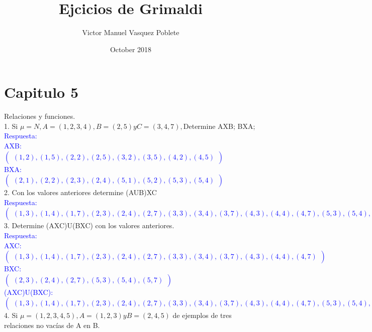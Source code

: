 \documentclass{article}
\title{Ejcicios de Grimaldi}
\author{Victor Manuel Vasquez Poblete }
\date{October 2018}
\begin{document}
\maketitle
\section{Capitulo 5}Relaciones y funciones.\\
1.  Si $\mu =N, A=(1,2,3,4), B=(2,5) y C=(3,4,7),$Determine AXB; BXA;\\
\textcolor{blue}{Respuesta:\\AXB:\\
$
\left(\begin{smallmatrix}
(1,2),(1,5),(2,2),(2,5),(3,2),(3,5),(4,2),(4,5)
\end{smallmatrix}\right)
$\\
BXA:\\
$
\left(\begin{smallmatrix}
(2,1),(2,2),(2,3),(2,4),(5,1),(5,2),(5,3),(5,4)
\end{smallmatrix}\right)
$
}\\
2. Con los valores anteriores determine (AUB)XC\\
\textcolor{blue}{Respuesta:\\
$
\left(\begin{smallmatrix}
(1,3),(1,4),(1,7),(2,3),(2,4),(2,7),(3,3),(3,4),(3,7),(4,3),(4,4),(4,7),(5,3),(5,4),(5,7)
\end{smallmatrix}\right)
$
}\\
3. Determine (AXC)U(BXC) con los valores anteriores.\\
\textcolor{blue}{Respuesta:\\
AXC:\\
$
\left(\begin{smallmatrix}
(1,3),(1,4),(1,7),(2,3),(2,4),(2,7),(3,3),(3,4),(3,7),(4,3),(4,4),(4,7)
\end{smallmatrix}\right)
$\\
BXC:\\
$
\left(\begin{smallmatrix}
(2,3),(2,4),(2,7),(5,3),(5,4),(5,7)
\end{smallmatrix}\right)
$\\
(AXC)U(BXC):\\
$
\left(\begin{smallmatrix}
(1,3),(1,4),(1,7),(2,3),(2,4),(2,7),(3,3),(3,4),(3,7),(4,3),(4,4),(4,7),(5,3),(5,4),(5,7)
\end{smallmatrix}\right)
$
}
4. Si $\mu = (1,2,3,4,5) , A=(1,2,3) y B=(2,4,5)$ de ejemplos de tres relaciones no vacías de A en B.\\
\end{document}

